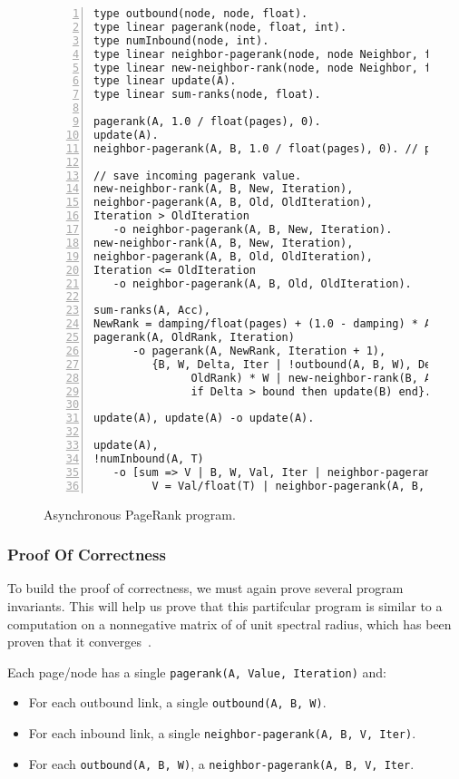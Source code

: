 \begin{figure}[h!]
\begin{Verbatim}[numbers=left,fontsize=\scriptsize]
type outbound(node, node, float).
type linear pagerank(node, float, int).
type numInbound(node, int).
type linear neighbor-pagerank(node, node Neighbor, float Rank, int Iteration).
type linear new-neighbor-rank(node, node Neighbor, float Rank, int Iteration).
type linear update(A).
type linear sum-ranks(node, float).

pagerank(A, 1.0 / float(pages), 0).
update(A).
neighbor-pagerank(A, B, 1.0 / float(pages), 0). // pagerank of B is ...

// save incoming pagerank value.
new-neighbor-rank(A, B, New, Iteration),
neighbor-pagerank(A, B, Old, OldIteration),
Iteration > OldIteration
   -o neighbor-pagerank(A, B, New, Iteration).
new-neighbor-rank(A, B, New, Iteration),
neighbor-pagerank(A, B, Old, OldIteration),
Iteration <= OldIteration
   -o neighbor-pagerank(A, B, Old, OldIteration).

sum-ranks(A, Acc),
NewRank = damping/float(pages) + (1.0 - damping) * Acc,
pagerank(A, OldRank, Iteration)
      -o pagerank(A, NewRank, Iteration + 1),
         {B, W, Delta, Iter | !outbound(A, B, W), Delta = fabs(NewRank -
               OldRank) * W | new-neighbor-rank(B, A, NewRank, Iteration + 1),
               if Delta > bound then update(B) end}.

update(A), update(A) -o update(A).

update(A),
!numInbound(A, T)
   -o [sum => V | B, W, Val, Iter | neighbor-pagerank(A, B, Val, Iter),
         V = Val/float(T) | neighbor-pagerank(A, B, Val, Iter) | sum-ranks(A, V)].
\end{Verbatim}
\caption{Asynchronous PageRank program.}
\label{language:code:async_pagerank}
\end{figure}

\subsubsection{Proof Of Correctness}

To build the proof of correctness, we must again prove several program
invariants. This will help us prove that this partifcular program is similar to
a computation on a nonnegative matrix of of unit spectral radius, which has been
proven that it converges~\cite{DBLP:journals/corr/abs-cs-0606047,
Lubachevsky:1986:CAA:4904.4801}.

\begin{invariant}
Each page/node has a single \texttt{pagerank(A, Value, Iteration)} and:
\begin{itemize}
   \item For each outbound link, a single \texttt{\bang outbound(A, B, W)}.
   \item For each inbound link, a single \texttt{neighbor-pagerank(A, B, V, Iter)}.
   \item For each \texttt{\bang outbound(A, B, W)}, a \texttt{neighbor-pagerank(A,
      B, V, Iter}.
\end{itemize}
\end{invariant}

